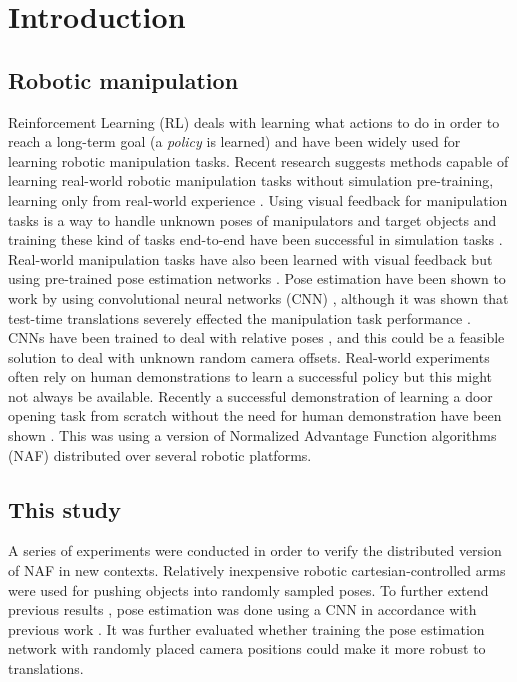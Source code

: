 \section{Introduction}

\subsection{Robotic manipulation}

Reinforcement Learning (RL) deals with learning what actions to do in order to reach
a long-term goal (a \textit{policy} is learned) and have been widely used for
learning robotic manipulation tasks. Recent research suggests methods capable
of learning real-world robotic manipulation tasks without simulation
pre-training, learning only from real-world experience
\cite{yahya2016collective,gu2016deep,finn2016deep,chebotar2016path}. Using
visual feedback for manipulation tasks is a way to handle unknown
poses of manipulators and target objects and training these kind of tasks
end-to-end have been successful in simulation tasks
\cite{schulman2015trust,lillicrap2015continuous}. Real-world manipulation tasks
have also been learned with visual feedback but using pre-trained pose
estimation networks \cite{gu2016deep}. Pose estimation have been shown to work
by using convolutional neural networks (CNN)
\cite{levine2016end,chebotar2016path,yahya2016collective}, although it was
shown that test-time translations severely effected the manipulation task
performance \cite{yahya2016collective}. CNNs have been trained to deal with
relative poses \cite{park20163d}, and this could be a feasible solution to deal
with unknown random camera offsets. Real-world experiments often rely on human
demonstrations to learn a successful policy but this might not always be
available. Recently a successful demonstration of learning a door opening task
from scratch without the need for human demonstration have been shown
\cite{gu2016deep}. This was using a version of Normalized Advantage Function
algorithms (NAF) distributed over several robotic platforms.

\subsection{This study}

A series of experiments were conducted in order to verify the distributed
version of NAF in new contexts. Relatively inexpensive robotic
cartesian-controlled arms were used for pushing objects into randomly sampled
poses. To further extend previous results \cite{gu2016deep}, pose estimation
was done using a CNN in accordance with previous work
\cite{levine2016end,chebotar2016path,yahya2016collective}. It was further
evaluated whether training the pose estimation network with randomly placed
camera positions could make it more robust to translations.

